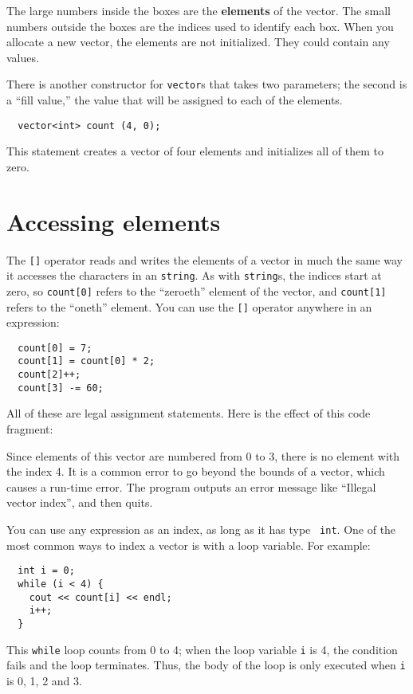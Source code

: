 The large numbers inside the boxes are the {\bf elements} of
the vector.  The small numbers outside the boxes are the
indices used to identify each box.  When you allocate a new
vector, the elements are not initialized.  They could contain
any values.

There is another constructor for {\tt vector}s that takes
two parameters; the second is a ``fill value,'' the
value that will be assigned to each of the elements.

\begin{verbatim}
  vector<int> count (4, 0);
\end{verbatim}
%
This statement creates a vector of four elements and initializes
all of them to zero.

\section{Accessing elements}

The {\tt []} operator reads and writes the elements of a vector in
much the same way it accesses the characters in an {\tt string}.  As
with {\tt string}s, the indices start at zero, so {\tt count[0]}
refers to the ``zeroeth'' element of the vector, and {\tt count[1]}
refers to the ``oneth'' element.  You can use the {\tt []} operator
anywhere in an expression:

\begin{verbatim}
  count[0] = 7;
  count[1] = count[0] * 2;
  count[2]++;
  count[3] -= 60;
\end{verbatim}
%
All of these are legal assignment statements.  Here is the
effect of this code fragment:

\vspace{0.1in}
\centerline{}
\vspace{0.1in}

Since elements of this vector are numbered from 0 to 3, there is no
element with the index 4.  It is a common error to go beyond the
bounds of a vector, which causes a run-time error.  The program outputs
an error message like ``Illegal vector index'', and then quits.


You can use any expression as an index, as long as it has type {\tt
int}.  One of the most common ways to index a vector is with a loop
variable.  For example:

\begin{verbatim}
  int i = 0;
  while (i < 4) {
    cout << count[i] << endl;
    i++;
  }
\end{verbatim}
%
This {\tt while} loop counts from 0
to 4; when the loop variable {\tt i} is 4, the
condition fails and the loop terminates.  Thus, the body
of the loop is only executed when {\tt i} is 0, 1, 2 and 3.

